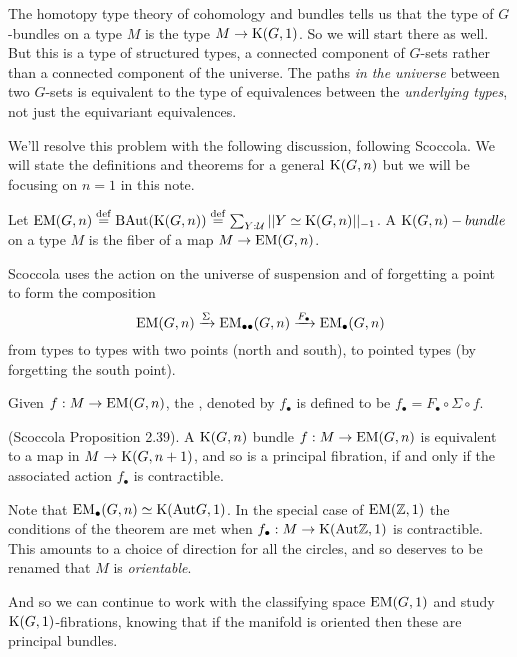 The homotopy type theory of cohomology and bundles tells us that the type of \( G \)-bundles on a type \( M \) is the type \( M\to\mathrm{K}(G,1) \). So we will start there as well. But this is a type of structured types, a connected component of \( G \)-sets rather than a connected component of the universe. The paths \emph{in the universe} between two \( G \)-sets is equivalent to the type of equivalences between the \emph{underlying types}, not just the equivariant equivalences.

We'll resolve this problem with the following discussion, following Scoccola\cite{sco}. We will state the definitions and theorems for a general \( \mathrm{K}(G,n) \) but we will be focusing on \( n=1 \) in this note.

\begin{mydef}
Let \( \mathrm{EM}(G,n)\stackrel{\mathrm{def}}{=} \mathrm{BAut}(\mathrm{K}(G,n))\stackrel{\mathrm{def}}{=} \sum_{Y:\mathcal{U}}||Y\simeq \mathrm{K}(G,n)||_{-1}\). A \( \mathrm{K}(G,n)-bundle \) on a type \( M \) is the fiber of a map \( M\to\mathrm{EM}(G,n) \).
\end{mydef}

Scoccola uses the action on the universe of suspension and of forgetting a point to form the composition 
\[ 
\mathrm{EM}(G,n)\xrightarrow[]{\Sigma} \mathrm{EM}_{\bullet\bullet}(G,n)\xrightarrow[]{F_\bullet}\mathrm{EM_{\bullet}}(G,n)
\]
from types to types with two points (north and south), to pointed types (by forgetting the south point).

\begin{mydef}
Given \( f:M\to\mathrm{EM}(G,n) \), the , denoted by \( f_\bullet \) is defined to be \( f_\bullet=F_\bullet\circ\Sigma\circ f \).
\end{mydef}

\begin{mythm}
(Scoccola\cite{sco} Proposition 2.39). A \( \mathrm{K}(G,n) \) bundle \( f:M\to\mathrm{EM}(G,n) \) is equivalent to a map in \( M\to\mathrm{K}(G,n+1) \), and so is a principal fibration, if and only if the associated action \( f_\bullet \) is contractible.
\end{mythm}

Note that \( \mathrm{EM_{\bullet}}(G,n)\simeq \mathrm{K}(\mathrm{Aut} G,1) \). In the special case of \( \mathrm{EM}(\mathbb{Z},1) \) the conditions of the theorem are met when \( f_\bullet:M\to\mathrm{K}(\mathrm{Aut} \mathbb{Z}, 1) \) is contractible. This amounts to a choice of direction for all the circles, and so deserves to be renamed that \( M \) is \emph{orientable}.

And so we can continue to work with the classifying space \( \mathrm{EM}(G,1) \) and study \( \mathrm{K}(G,1) \)-fibrations, knowing that if the manifold is oriented then these are principal bundles.


